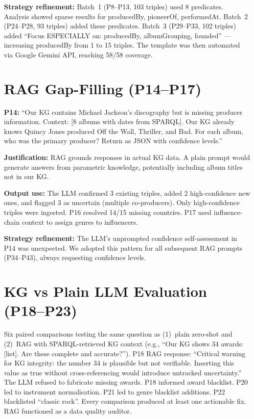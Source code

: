 \documentclass[11pt,a4paper]{article}
\begin{document}
\textbf{Strategy refinement:} Batch~1 (P8--P13, 103 triples) used 8 predicates. Analysis showed sparse results for producedBy, pioneerOf, performedAt. Batch~2 (P24--P28, 93 triples) added these predicates. Batch~3 (P29--P33, 102 triples) added ``Focus ESPECIALLY on: producedBy, albumGrouping, founded'' --- increasing producedBy from 1 to 15 triples. The template was then automated via Google Gemini API, reaching 58/58 coverage.

\section{RAG Gap-Filling (P14--P17)}

\textbf{P14:} ``Our KG contains Michael Jackson's discography but is missing producer information. Context: [8 albums with dates from SPARQL]. Our KG already knows Quincy Jones produced Off the Wall, Thriller, and Bad. For each album, who was the primary producer? Return as JSON with confidence levels.''

\textbf{Justification:} RAG grounds responses in actual KG data. A plain prompt would generate answers from parametric knowledge, potentially including album titles not in our KG.

\textbf{Output use:} The LLM confirmed 3 existing triples, added 2 high-confidence new ones, and flagged 3 as uncertain (multiple co-producers). Only high-confidence triples were ingested. P16 resolved 14/15 missing countries. P17 used influence-chain context to assign genres to influencers.

\textbf{Strategy refinement:} The LLM's unprompted confidence self-assessment in P14 was unexpected. We adopted this pattern for all subsequent RAG prompts (P34--P43), always requesting confidence levels.

\section{KG vs Plain LLM Evaluation (P18--P23)}

Six paired comparisons testing the same question as (1)~plain zero-shot and (2)~RAG with SPARQL-retrieved KG context (e.g., ``Our KG shows 34 awards: [list]. Are these complete and accurate?''). P18 RAG response: ``Critical warning for KG integrity: the number 34 is plausible but not verifiable. Inserting this value as true without cross-referencing would introduce untracked uncertainty.'' The LLM refused to fabricate missing awards. P18 informed award blacklist. P20 led to instrument normalisation. P21 led to genre blacklist additions. P22 blacklisted ``classic rock''. Every comparison produced at least one actionable fix. RAG functioned as a data quality auditor.
\end{document}
